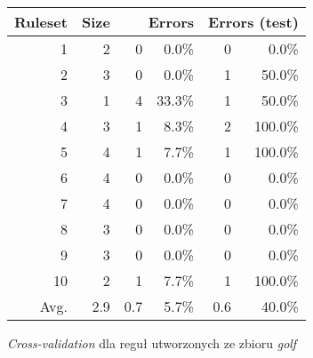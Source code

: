 \begin{figure}
\begin{tabular}{|r|r|rr|rr|}
\hline
 Ruleset & 
 Size & 
 \multicolumn{2}{1|}{Errors} & 
 \multicolumn{2}{1|}{Errors (test)} \\
\hline\hline
       1 &    2 &    0 &  0.0\%  &    0 &   0.0\% \\
       2 &    3 &    0 &  0.0\%  &    1 &  50.0\% \\
       3 &    1 &    4 & 33.3\%  &    1 &  50.0\% \\
       4 &    3 &    1 &  8.3\%  &    2 & 100.0\% \\
       5 &    4 &    1 &  7.7\%  &    1 & 100.0\% \\
       6 &    4 &    0 &  0.0\%  &    0 &   0.0\% \\
       7 &    4 &    0 &  0.0\%  &    0 &   0.0\% \\
       8 &    3 &    0 &  0.0\%  &    0 &   0.0\% \\
       9 &    3 &    0 &  0.0\%  &    0 &   0.0\% \\
      10 &    2 &    1 &  7.7\%  &    1 & 100.0\% \\
\hline\hline
    Avg. &  2.9 &  0.7 &  5.7\%  &  0.6 &  40.0\% \\
\hline
\end{tabular}
\caption{\emph{Cross-validation} dla reguł utworzonych ze zbioru \emph{golf}}
\label{p2t2-golf-rules-cv}
\end{figure}

